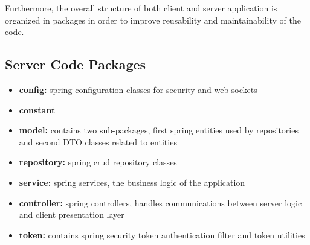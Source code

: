 \documentclass[a4paper]{article}
\begin{document}
Furthermore, the overall structure of both client and server application is organized in packages in order to improve reusability and maintainability of the code.

\subsection{Server Code Packages}
\begin{itemize}
\item \textbf{config:} spring configuration classes for security and web sockets
\item \textbf{constant}
\item \textbf{model:} contains two sub-packages, first spring entities used by repositories and second DTO classes related to entities
\item \textbf{repository:} spring crud repository classes
\item \textbf{service:} spring services, the business logic of the application
\item \textbf{controller:} spring controllers, handles communications between server logic and client presentation layer
\item \textbf{token:} contains spring security token authentication filter and token utilities
\end{itemize}
\end{document}
